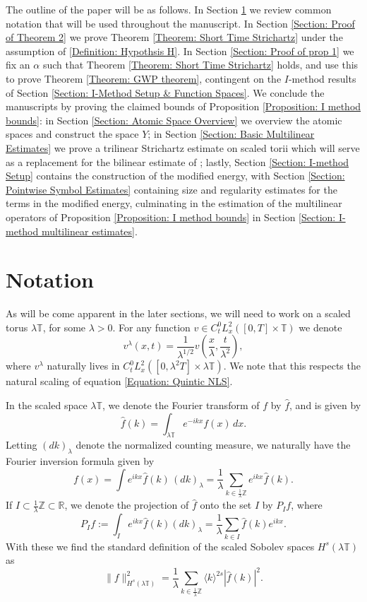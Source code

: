 \documentclass[12pt, letterpaper]{amsart}
\begin{document}
The outline of the paper will be as follows. In Section \ref{Section: Notation} we review common notation that will be used throughout the manuscript. In Section \ref{Section: Proof of Theorem 2} we prove Theorem \ref{Theorem: Short Time Strichartz} under the assumption of \eqref{Definition: Hypothsis H}. In Section \ref{Section: Proof of prop 1} we fix an $\alpha$ such that Theorem \ref{Theorem: Short Time Strichartz} holds, and use this to prove Theorem \ref{Theorem: GWP theorem}, contingent on the $I$-method results of Section \ref{Section: I-Method Setup & Function Spaces}. We conclude the manuscripts by proving the claimed bounds of Proposition \ref{Proposition: I method bounds}: in Section \ref{Section: Atomic Space Overview} we overview the atomic spaces and construct the space $Y$; in Section \ref{Section: Basic Multilinear Estimates} we prove a trilinear Strichartz estimate on scaled torii which will serve as a replacement for the bilinear estimate of \cite{de2007global, li2011global}; lastly, Section \ref{Section: I-method Setup} contains the construction of the modified energy, with Section \ref{Section: Pointwise Symbol Estimates} containing size and regularity estimates for the terms in the modified energy, culminating in the estimation of the multilinear operators of Proposition \ref{Proposition: I method bounds} in Section \ref{Section: I-method multilinear estimates}.

\section{Notation}\label{Section: Notation}
As will be come apparent in the later sections, we will need to work on a scaled torus $\lambda\mathbb{T}$, for some $\lambda > 0$. For any function $v\in C^0_tL^2_x([0,T]\times \mathbb{T})$ we denote
\[
v^{\lambda}(x,t) = \frac{1}{\lambda^{1/2}}v\left(\frac{x}{\lambda}, \frac{t}{\lambda^2}\right),
\]
where $v^\lambda$ naturally lives in $C^0_tL^2_x([0,\lambda^2 T]\times \lambda \mathbb{T})$. We note that this respects the natural scaling of equation \eqref{Equation: Quintic NLS}.

In the scaled space $\lambda\mathbb{T}$, we denote the Fourier transform of $f$ by $\widehat{f}$, and is given by
\[
\widehat{f}(k) = \int_{\lambda\mathbb{T}}e^{-ikx}f(x)\,dx.
\]
Letting $(dk)_\lambda$ denote the normalized counting measure, we naturally have the Fourier inversion formula given by
\[
f(x) = \int e^{ikx}\widehat{f}(k)\,(dk)_\lambda = \frac{1}{\lambda}\sum_{k\in\frac{1}{\lambda}\mathbb{Z}}e^{ikx}\widehat{f}(k).
\]
If $I\subset \tfrac{1}{\lambda}\mathbb{Z}\subset \mathbb{R}$, we denote the projection of $\widehat{f}$ onto the set $I$ by $P_I f$, where
\[
P_If := \int_{I} e^{ikx}\widehat{f}(k)(dk)_\lambda = \frac{1}{\lambda}\sum_{k\in I}\widehat{f}(k)e^{ikx}.
\]
With these we find the standard definition of the scaled Sobolev spaces $H^s(\lambda\mathbb{T})$ as
\[
\|f\|^2_{H^s(\lambda\mathbb{T})} = \frac{1}{\lambda}\sum_{k\in\frac{1}{\lambda}\mathbb{Z}}\langle k\rangle^{2s}|\widehat{f}(k)|^2.
\]
\end{document}
